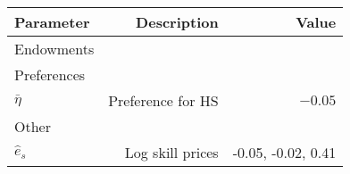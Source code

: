 \begin{tabular}{lrr}
\hline
Parameter & Description  & Value  \\
\hline
Endowments &   &   \\
Preferences &   &   \\
$\bar{\eta}$ & Preference for HS  & $-0.05$  \\
Other &   &   \\
$\hat{e}_{s}$ & Log skill prices  & -0.05, -0.02, 0.41  \\
\hline
\end{tabular}%
